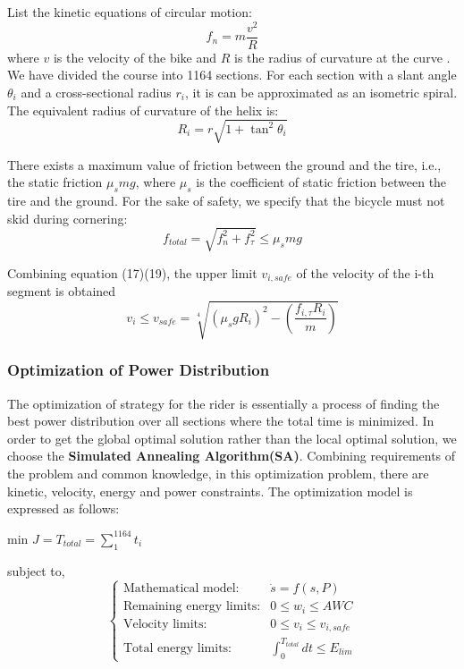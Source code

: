\documentclass{mcmthesis}
\begin{document}
List the kinetic equations of circular motion:
\begin{equation}
	f_n=m\frac{v^2}{R}
\end{equation}
where $v$ is the velocity of the bike and $R$ is the radius of curvature at the curve . We have divided the course into 1164 sections. For each section with a slant angle $\theta_i$ and a cross-sectional radius $r_i$, it is can be approximated as an isometric spiral. The equivalent radius of curvature of the helix is:
\begin{equation}
	R_i=r\sqrt{1+\tan^2\theta_i}
\end{equation}

There exists a maximum value of friction between the ground and the tire, i.e., the static friction $\mu_s mg$, where ${\mu}_s$ is the coefficient of static friction between the tire and the ground. For the sake of safety, we specify that the bicycle must not skid during cornering:
\begin{equation}
	f_{total}=\sqrt{f_n^2+f_{\tau}^2}\leq \mu_s mg
\end{equation}

Combining equation (17)(19), the upper limit $v_{i,safe}$ of the velocity of the i-th segment is obtained
\begin{equation}
	v_i\leq v_{safe}=\sqrt[4]{(\mu_s gR_i)^2-(\frac{f_{i,\tau }R_i}{m})} 
\end{equation}




\subsubsection{Optimization of Power Distribution}

The optimization of strategy for the rider is essentially a process of finding the best power distribution over all sections where the total time is minimized. In order to get the global optimal solution rather than the local optimal solution, we choose the {\bf Simulated Annealing Algorithm(SA)}. Combining requirements of the problem and common knowledge, in this optimization problem, there are kinetic, velocity, energy and power constraints. The optimization model is expressed as follows:
\begin{center}
	min $J=T_{total}=\sum_{1}^{1164}t_i$
\end{center}
subject to,
\begin{equation}
	\begin{cases} \text{Mathematical model:}&\dot{s}=f(s,P)\\
		\text{Remaining energy limits:}&0\leq w_i\leq AWC\\
		\text{Velocity limits:}&0\leq v_i\leq v_{i,safe}\\
		\text{Total energy limits:}&\int_{0}^{T_{total}}dt \leq E_{lim} 
	\end{cases}
\end{equation}
\end{document}
